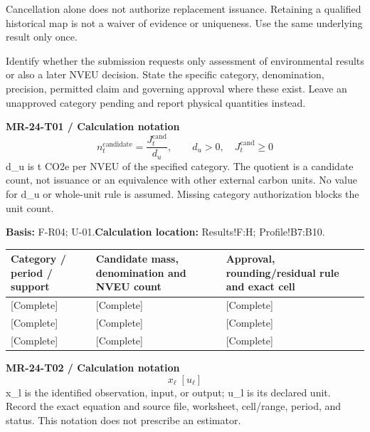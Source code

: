 Cancellation alone does not authorize replacement issuance. Retaining a qualified historical map is not a waiver of evidence or uniqueness. Use the same underlying result only once.\par
{}
Identify whether the submission requests only assessment of environmental results or also a later NVEU decision. State the specific category, denomination, precision, permitted claim and governing approval where these exist. Leave an unapproved category pending and report physical quantities instead.\par
{}
\par\begingroup\sffamily\fontsize{8.4}{10.5}\selectfont\color{NEBGreen}
\textbf{MR-24-T01 / Calculation notation}\
{\fontsize{10}{12}\selectfont\[n_t^{\mathrm{candidate}}=\frac{J_t^{\mathrm{cand}}}{d_u},\qquad d_u>0,\quad J_t^{\mathrm{cand}}\ge0\]}
d\_u is t CO2e per NVEU of the specified category. The quotient is a candidate count, not issuance or an equivalence with other external carbon units. No value for d\_u or whole-unit rule is assumed. Missing category authorization blocks the unit count.\par
\textbf{Basis:} F-R04; U-01.\quad\textbf{Calculation location:} Results!F:H; Profile!B7:B10.\par\endgroup
{\sffamily\fontsize{8.6}{10.7}\selectfont\begin{longtable}{@{}P{48mm}P{61mm}P{53mm}@{}}
\toprule
\textbf{Category / period / support} & \textbf{Candidate mass, denomination and NVEU count} & \textbf{Approval, rounding/residual rule and exact cell}\\\midrule\endhead
\rule{0pt}{8mm}[Complete] & [Complete] & [Complete]\\\hline
\rule{0pt}{8mm}[Complete] & [Complete] & [Complete]\\\hline
\rule{0pt}{8mm}[Complete] & [Complete] & [Complete]\\\hline
\end{longtable}}
\par\begingroup\sffamily\fontsize{8.4}{10.5}\selectfont\color{NEBGreen}
\textbf{MR-24-T02 / Calculation notation}\
{\fontsize{10}{12}\selectfont\[x_{\ell}\;[u_{\ell}]\]}
x\_l is the identified observation, input, or output; u\_l is its declared unit. Record the exact equation and source file, worksheet, cell/range, period, and status. This notation does not prescribe an estimator.\par
